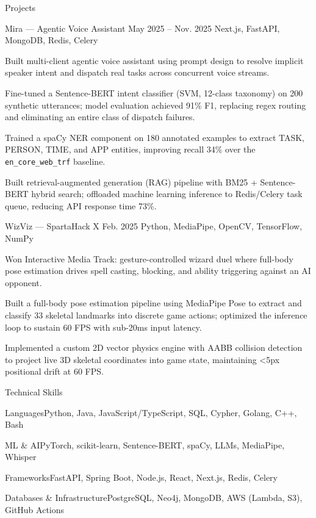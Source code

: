 \documentclass[
	11pt
]{../../../resume}
\begin{document}
	\begin{rSection}{P}{rojects}
		\begin{rSectionEntry}
			{Mira --- Agentic Voice Assistant}
			{May 2025 -- Nov. 2025}
			{}
			{Next.js, FastAPI, MongoDB, Redis, Celery}
			{}

			\item Built multi-client agentic voice assistant using prompt design to resolve implicit speaker intent and dispatch real tasks across concurrent voice streams.
			\item Fine-tuned a Sentence-BERT intent classifier (SVM, 12-class taxonomy) on 200 synthetic utterances; model evaluation achieved 91\% F1, replacing regex routing and eliminating an entire class of dispatch failures.
			\item Trained a spaCy NER component on 180 annotated examples to extract TASK, PERSON, TIME, and APP entities, improving recall 34\% over the \texttt{en\_core\_web\_trf} baseline.
			\item Built retrieval-augmented generation (RAG) pipeline with BM25 + Sentence-BERT hybrid search; offloaded machine learning inference to Redis/Celery task queue, reducing API response time 73\%.
		\end{rSectionEntry}

		\begin{rSectionEntry}
			{WizViz --- SpartaHack X}
			{Feb. 2025}
			{}
			{Python, MediaPipe, OpenCV, TensorFlow, NumPy}
			{}

			\item Won Interactive Media Track: gesture-controlled wizard duel where full-body pose estimation drives spell casting, blocking, and ability triggering against an AI opponent.
			\item Built a full-body pose estimation pipeline using MediaPipe Pose to extract and classify 33 skeletal landmarks into discrete game actions; optimized the inference loop to sustain 60 FPS with sub-20ms input latency.
			\item Implemented a custom 2D vector physics engine with AABB collision detection to project live 3D skeletal coordinates into game state, maintaining \textless5px positional drift at 60 FPS.
		\end{rSectionEntry}
	\end{rSection}

	\begin{rSection}{T}{echnical Skills}
		\begin{rSet}{Languages}{Python, Java, JavaScript/TypeScript, SQL, Cypher, Golang, C++, Bash}
		\end{rSet}
		\begin{rSet}{ML \& AI}{PyTorch, scikit-learn, Sentence-BERT, spaCy, LLMs, MediaPipe, Whisper}
		\end{rSet}
		\begin{rSet}{Frameworks}{FastAPI, Spring Boot, Node.js, React, Next.js, Redis, Celery}
		\end{rSet}
		\begin{rSet}{Databases \& Infrastructure}{PostgreSQL, Neo4j, MongoDB, AWS (Lambda, S3), GitHub Actions}
		\end{rSet}
	\end{rSection}
\end{document}
